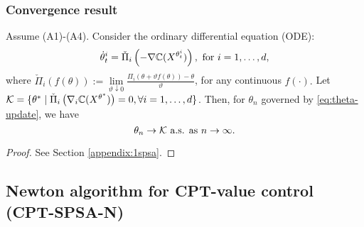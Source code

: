\subsubsection*{Convergence result}
\begin{theorem}
\label{thm:1spsa-conv}
Assume (A1)-(A4).
Consider the  ordinary differential equation (ODE): 
$$\dot\theta^{i}_t = \check\Pi_{i}\left(- \nabla \mathbb{C}(X^{\theta^{i}_t})\right), \text{ for }i=1,\dots,d,$$ 
where 
$\check\Pi_{i}(f(\theta)) := \lim\limits_{\vartheta \downarrow 0} \frac{\Pi_{i}(\theta + \vartheta f(\theta)) - \theta}{\vartheta}$, for any continuous $f(\cdot).$
 Let $\mathcal{K} = \{\theta^* \mid \check\Pi_{i} \left(\nabla_i \mathbb{C}(X^{\theta^*})\right)=0, \forall i=1,\ldots,d\}$. Then, for $\theta_n$ governed by \eqref{eq:theta-update}, we have
$$\theta_n \rightarrow \mathcal{K} \text{ a.s. as } n\rightarrow \infty.$$
\end{theorem}

\begin{proof}
 See Section \ref{appendix:1spsa}.
\end{proof}

\subsection{Newton algorithm for CPT-value control (CPT-SPSA-N)}
\label{sec:2spsa}
